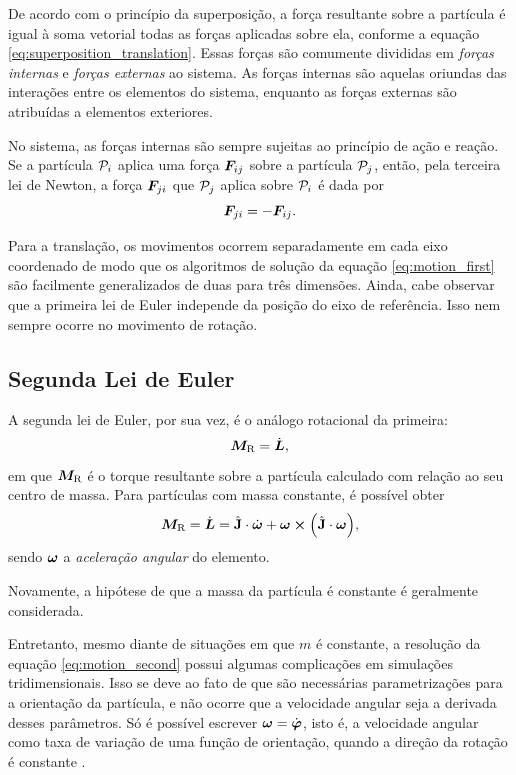 De acordo com o princípio da superposição, a força resultante sobre a partícula é igual à soma vetorial todas as forças aplicadas sobre ela, conforme a equação \eqref{eq:superposition_translation}. Essas forças são comumente divididas em \textit{forças internas} e \textit{forças externas} ao sistema. As forças internas são aquelas oriundas das interações entre os elementos do sistema, enquanto as forças externas são atribuídas a elementos exteriores. 

No sistema, as forças internas são sempre sujeitas ao princípio de ação e reação. Se a partícula \(\particlei\) aplica uma força \({\bm{F}}_{i j}\) sobre a partícula \(\particlej\), então, pela terceira lei de Newton,  a força \({\bm{F}}_{j i}\) que \(\particlej\) aplica sobre \(\particlei\) é dada por
\begin{equation*}
	{\bm{F}}_{j i} = - {\bm{F}}_{i j}.
\end{equation*}

Para a translação, os movimentos ocorrem separadamente em cada eixo coordenado de modo que os algoritmos de solução da equação \eqref{eq:motion_first} são facilmente generalizados de duas para três dimensões. Ainda, cabe observar que a primeira lei de Euler independe da posição do eixo de referência. Isso nem sempre ocorre no movimento de rotação.

\subsection{Segunda Lei de Euler}

A segunda lei de Euler, por sua vez, é o análogo rotacional da primeira:
\begin{equation*} %
	\resultingTorque = \deriv{1}{\angularMomentum},
\end{equation*}
em que \(\bm{M}_{\text{R}}\) é o torque resultante sobre a partícula calculado com relação ao seu centro de massa. Para partículas com massa constante, é possível obter
\begin{equation} \label{eq:motion_second}
	\resultingTorque = \deriv{1}{\angularMomentum} = \tensorOfInertia\cdot\deriv{1}{\angularVelocity} + \angularVelocity\cross\pqty{\tensorOfInertia\cdot\angularVelocity},
\end{equation}
sendo \(\bm{\omega}\) a \textit{aceleração angular} do elemento.

Novamente, a hipótese de que a massa da partícula é constante é geralmente considerada. 

Entretanto, mesmo diante de situações em que \(m\) é constante, a resolução da equação \eqref{eq:motion_second} possui algumas complicações em simulações tridimensionais. Isso se deve ao fato de que são necessárias parametrizações para a orientação da partícula, e não ocorre que a velocidade angular seja a derivada desses parâmetros. Só é possível escrever \(\angularVelocity = \deriv{1}{\orientation}\), isto é, a velocidade angular como taxa de variação de uma função de orientação, quando a direção da rotação é constante \cite[p. 32]{bib:dynamics_of_multibody_systems}.

